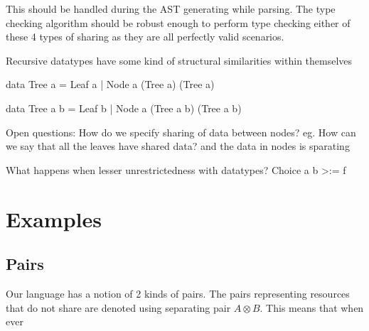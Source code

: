 This should be handled during the AST generating while parsing.
The type checking algorithm should be robust enough
to perform type checking either of these 4 types of sharing as they are
all perfectly valid scenarios.

Recursive datatypes have some kind of structural similarities within themselves

data Tree a = Leaf a | Node a (Tree a) (Tree a)

data Tree a b = Leaf b | Node a (Tree a b) (Tree a b)

Open questions:
How do we specify sharing of data between nodes?
eg. How can we say that all the leaves have shared data? and the data in nodes is sparating


What happens when lesser unrestrictedness with datatypes? Choice a b >:= f


\section{Examples}

\subsection{Pairs}

Our language has a notion of 2 kinds of pairs. The pairs representing resources that do not share
are denoted using separating pair $A \otimes B$. This means that when ever 



